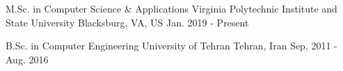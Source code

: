 \begin{cventries}
  \cventryshort
    {M.Sc. in Computer Science \& Applications} %
    {Virginia Polytechnic Institute and State University} %
    {Blacksburg, VA, US} %
    {Jan. 2019 - Present} %

  \cventryshort
    {B.Sc. in Computer Engineering} %
    {University of Tehran} %
    {Tehran, Iran} %
    {Sep. 2011 - Aug. 2016} %
\end{cventries}
